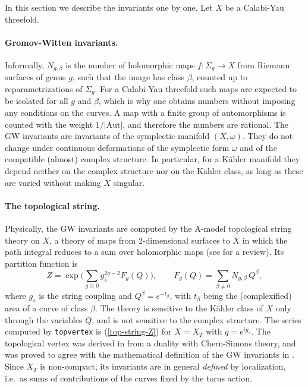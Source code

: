 \documentclass[11pt]{article}
\newcommand{\topvertex}{\texttt{topvertex}}
\begin{document}
In this section we describe the invariants one by one. Let $X$ be a Calabi-Yau threefold.

\paragraph{Gromov-Witten invariants.} Informally, $N_{g,\beta}$ is the number of holomorphic maps
$f:\Sigma_g\rightarrow X$ from Riemann surfaces of genus $g$, such that the image has class $\beta$, counted up to reparametrizations of
$\Sigma_g$. For a Calabi-Yau threefold such maps are expected to be isolated for all $g$ and
$\beta$, which is why one obtains numbers without imposing any conditions on the curves. A map
with a finite group of automorphisms is counted with the weight $1/|\mathrm{Aut}|$, and
therefore the numbers are rational. The GW
invariants are invariants of the symplectic manifold $(X,\omega)$. They do not change under
continuous deformations of the symplectic form $\omega$ and of the compatible (almost) complex
structure. In particular, for a K\"ahler manifold they depend neither on the complex structure
nor on the K\"ahler class, as long as these are varied without making $X$ singular.

\paragraph{The topological string.} Physically, the GW invariants are computed by the A-model
topological string theory on $X$, a theory of maps from 2-dimensional surfaces to $X$ in which
the path integral reduces to a sum over holomorphic maps (see \cite{Marino} for a review). Its
partition function is
\begin{equation}\label{top-string-Z}
Z=\exp\Big(\sum_{g\geq0}g_s^{2g-2}F_g(Q)\Big),\qquad F_g(Q)=\sum_{\beta\neq0}N_{g,\beta}\,Q^\beta,
\end{equation}
where $g_s$ is the string coupling and $Q^\beta=e^{-t_\beta}$, with $t_\beta$ being the
(complexified) area of a curve of class $\beta$. The theory is sensitive to the K\"ahler class
of $X$ only through the variables $Q$, and is not sensitive to the complex structure. The series
computed by \topvertex{} is (\ref{top-string-Z}) for $X=X_T$ with $q=e^{ig_s}$. The topological
vertex was derived in \cite{AKMV} from a duality with Chern-Simons theory, and was proved to
agree with the mathematical definition of the GW invariants in \cite{LLLZ,MOOP}. Since $X_T$ is
non-compact, its invariants are in general \textit{defined} by localization, i.e.\ as sums of
contributions of the curves fixed by the torus action.
\end{document}
